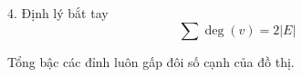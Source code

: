 \documentclass{beamer}
\begin{document}
\begin{frame}{4. Định lý bắt tay}
\Large
\[
\sum \deg(v) = 2|E|
\]

\vspace{0.3cm}
Tổng bậc các đỉnh luôn gấp đôi số cạnh của đồ thị.
\end{frame}
\end{document}
